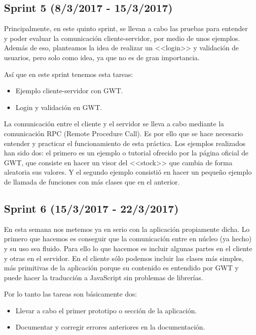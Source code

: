\subsection{Sprint 5 (8/3/2017 - 15/3/2017)}

Principalmente, en este quinto sprint, se llevan a cabo las pruebas para entender y poder evaluar la comunicación cliente-servidor, por medio de unos ejemplos. Además de eso, planteamos la idea de realizar un <<login>> y validación de usuarios, pero solo como idea, ya que no es de gran importancia.


Así que en este sprint tenemos esta tareas:

\begin{itemize}
\item Ejemplo cliente-servidor con GWT.
\item Login y validación en GWT.
\end{itemize}

La comunicación entre el cliente y el servidor se lleva a cabo mediante la comunicación RPC (Remote Procedure Call). Es por ello que se hace necesario entender y practicar el funcionamiento de esta práctica. Los ejemplos realizados han sido dos: el primero es un ejemplo o tutorial ofrecido por la página oficial de GWT, que consiste en hacer un visor del <<stock>> que cambia de forma aleatoria sus valores. Y el segundo ejemplo consistió en hacer un pequeño ejemplo de llamada de funciones con más clases que en el anterior.


\subsection{Sprint 6 (15/3/2017 - 22/3/2017)}

En esta semana nos metemos ya en serio con la aplicación propiamente dicha. Lo primero que hacemos es conseguir que la comunicación entre en núcleo (ya hecho) y su uso sea fluido. Para ello lo que hacemos es incluir algunas partes en el cliente y otras en el servidor. En el cliente sólo podemos incluir las clases más simples, más primitivas de la aplicación porque su contenido es entendido por GWT y puede hacer la traducción a JavaScript sin problemas de librerías.

Por lo tanto las tareas son básicamente dos:

\begin{itemize}
\item Llevar a cabo el primer prototipo o sección de la aplicación.
\item Documentar y corregir errores anteriores en la documentación.
\end{itemize}

